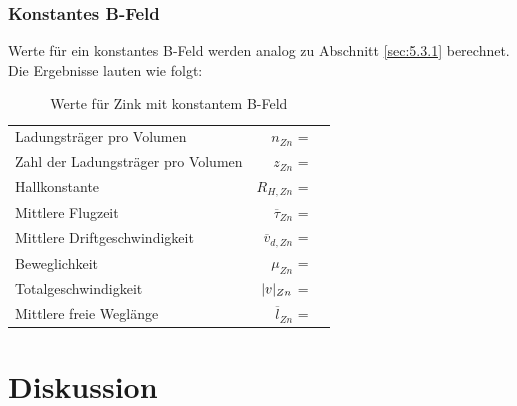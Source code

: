 \subsubsection{Konstantes B-Feld} \label{sec:5.5.2}

\justifying Werte für ein konstantes B-Feld werden analog zu Abschnitt \ref{sec:5.3.1} berechnet. 
Die Ergebnisse lauten wie folgt:

\begin{table}[H]
\centering
    \begin{tabular}{l r l}
    \toprule
        Ladungsträger pro Volumen               &$n_{Zn}$               = & \text{}  \\
        Zahl der Ladungsträger pro Volumen      &$z_{Zn}$               = & \text{}  \\
        Hallkonstante                           &$R_{H,Zn}$             = & \text{} \\
        Mittlere Flugzeit                       &$\overline{\tau}_{Zn}$ = & \text{}\\
        Mittlere Driftgeschwindigkeit           &$\overline{v}_{d,Zn}$  = & \text{}\\
        Beweglichkeit                           &$\mu_{Zn}$             = & \text{} \\
        Totalgeschwindigkeit                    &$\lvert v\rvert_{Zn}$         = & \text{}  \\
        Mittlere freie Weglänge                 &$\overline{l}_{Zn}$    = & \text{}  \\
        \bottomrule
    \end{tabular}
\caption{Werte für Zink mit konstantem B-Feld}
\label{tab:10}
\end{table}


\section{Diskussion}

